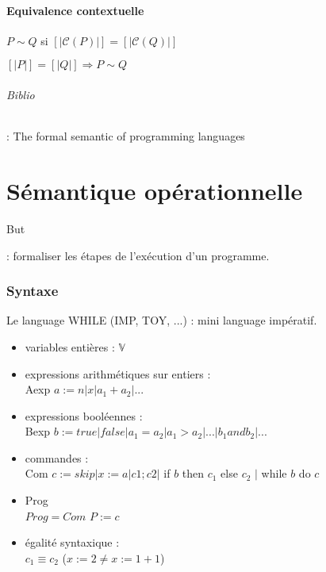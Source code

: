 \documentclass[10pt,a4paper]{article}
\newcommand{\semm}[1]{\left[| #1 | \right]}
\begin{document}
\subsection{Equivalence contextuelle}
$P \sim Q$ si $\semm{\mathcal{C}(P)} = \semm{\mathcal{C}(Q)}$
\begin{propriete}[Compostionnalité] 
$\semm P = \semm Q  \Rightarrow P \sim Q$
\end{propriete}
\paragraph{Biblio} :
The formal semantic of programming languages

\part{Sémantique opérationnelle}

\subparagraph{But} : formaliser les étapes de l'exécution d'un programme.

\section{Syntaxe}
Le language WHILE (IMP, TOY, ...) : mini language impératif.
\begin{itemize}
\item variables entières : $\mathbb{V}$
\item expressions arithmétiques sur entiers : \\
Aexp $ a := n \vert x \vert a_1 + a_2 \vert ...$
\item expressions booléennes : \\
Bexp $ b := true | false | a_1 = a_2 | a_1 > a_2 | ... | b_1 and b_2 | ...$
\item commandes : \\
Com $c := skip \vert x := a | c1; c2 |$ if $b$ then $c_1$ else $c_2$ $|$ while $b$ do $c$
\item Prog \\
$Prog = Com$ $P := c$
\item égalité syntaxique : \\
$c_1 \equiv c_2$ ($x := 2 \neq x := 1 + 1$)
\end{itemize}
\end{document}
